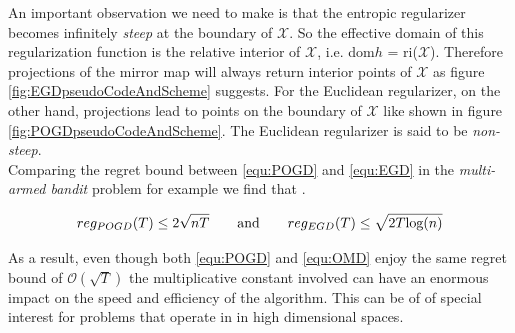 An important observation we need to make is that the entropic regularizer becomes infinitely \textit{steep} at the boundary of $\mathcal{X}$. So the effective domain of this regularization function is the relative interior of $\mathcal{X}$, i.e. dom$h$ = ri($\mathcal{X}$). Therefore projections of the mirror map will always return interior points of $\mathcal{X}$ as figure \ref{fig:EGDpseudoCodeAndScheme} suggests. For the Euclidean regularizer, on the other hand, projections lead to points on the boundary of $\mathcal{X}$ like shown in figure \ref{fig:POGDpseudoCodeAndScheme}. The Euclidean regularizer is said to be \textit{non-steep}. \\

Comparing the regret bound between \ref{equ:POGD} and \ref{equ:EGD} in the \textit{multi-armed bandit} problem for example we find that \cite{HDRmertikopoulos}. 

\begin{equation*}
    reg_{POGD}(T) \le 2\sqrt{nT} \qquad \textnormal{and} \qquad reg_{EGD}(T) \le \sqrt{2T\textnormal{log}(n)}
\end{equation*}

As a result, even though both \ref{equ:POGD} and \ref{equ:OMD} enjoy the same regret bound of $\mathcal{O}(\sqrt{T})$ the multiplicative constant involved can have an enormous impact on the speed and efficiency of the algorithm. This can be of of special interest for problems that operate in in high dimensional spaces. \\

